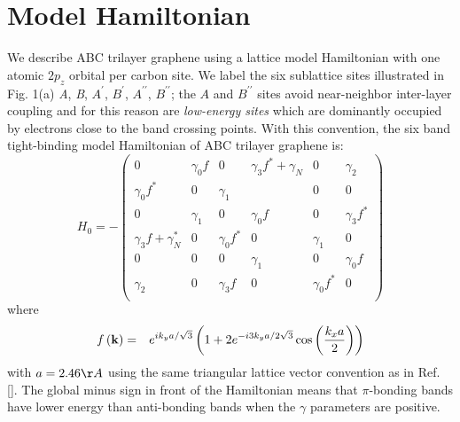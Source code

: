 \documentclass[twocolumn,prb,showpacs,preprintnumbers,amsmath,amssymb]{revtex4}
\begin{document}
\section{Model Hamiltonian}
We describe ABC trilayer graphene using a 
lattice model Hamiltonian with one atomic $2 p_z$ orbital per carbon site.
We label the six sublattice sites illustrated 
in Fig. 1(a)  {\em A}, {\em B}, $A^{\prime}$, $B^{\prime}$, $A^{\prime \prime}$, $B^{\prime \prime}$;  the 
$A$ and $B^{\prime \prime}$ sites avoid near-neighbor inter-layer coupling and for this reason are 
{\em low-energy sites} which are dominantly occupied by electrons close to the band crossing points.   
With this convention, the six band tight-binding model Hamiltonian of ABC trilayer graphene is:
\begin{equation}
\label{hamil}
{H}_0=  -
\begin{pmatrix}
     0                    &    \gamma_0 f         &   0 %
      &   \gamma_3 f^* + \gamma_N  &  0    &   \gamma_2   \\
 \gamma_0 f^*    &      0                        &   \gamma_1      &   %
 &  0    &   0 \\
 0 &       \gamma_1        &                     0   &   \gamma_0 f      &  0 %
 &   \gamma_3 f^* \\
 \gamma_3 f   + \gamma_N^*    &   0 %
 & \gamma_0 f^*   &    0    &      \gamma_1    &   0   \\
 0                        &   0                           &  0  %
 &   \gamma_1     &     0    &   \gamma_0 f   \\
 \gamma_2                        &   0                           & \gamma_3 f                       &    0    &     \gamma_0 f^*    &   0   \\
\end{pmatrix}
\end{equation}
where
\begin{eqnarray}
f\left( {\bf k} \right) &=&    e^{ i k_y a / \sqrt{3} } \left( 1 + 2 e^{-i 3 k_{y} a / 2\sqrt{3}}  
                                       \cos \left(  \frac{k_x a}{2} \right)    \right)  
\end{eqnarray}
with $a = 2.46 \AA$ using the same triangular lattice vector convention as in Ref. [].
The global minus sign in front of the Hamiltonian means that $\pi$-bonding bands 
have lower energy than anti-bonding bands when the $\gamma$ parameters are positive.  
\end{document}
